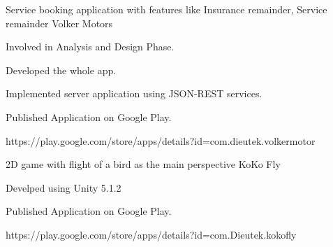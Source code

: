 \begin{cventries}
 \cventry
    {Service booking application with features like Insurance remainder, Service remainder} %
    {Volker Motors} %
    {} %
    {} %
    {
      \begin{cvitems} %
        \item {Involved in Analysis and Design Phase.}
        \item {Developed the whole app.}
        \item {Implemented server application using JSON-REST services.}
        \item {Published Application on Google Play.}
        \item{https://play.google.com/store/apps/details?id=com.dieutek.volkermotor}
      \end{cvitems}
    }


\cventry
    {2D game with flight of a bird as the main perspective} %
    {KoKo Fly} %
    {} %
    {} %
    {
      \begin{cvitems} %
        \item {Develped using Unity 5.1.2}
        \item {Published Application on Google Play.}
        \item{https://play.google.com/store/apps/details?id=com.Dieutek.kokofly}
      \end{cvitems}
    }


\end{cventries}
